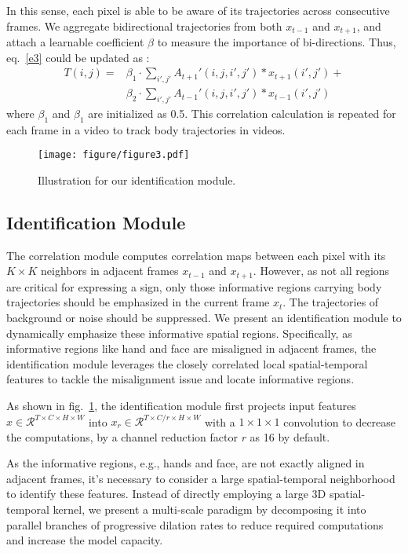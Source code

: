 \documentclass[10pt,twocolumn,letterpaper]{article}
\begin{document}
In this sense, each pixel is able to be aware of its trajectories across consecutive frames. We aggregate bidirectional trajectories from both $x_{t-1}$ and $x_{t+1}$, and attach a learnable coefficient $\beta$ to measure the importance of bi-directions. Thus, eq.~\ref{e3} could be updated as :
\begin{equation}
  \begin{aligned}
  \label{e4}
   T(i,j) = & \beta_{1}\cdot \sum_{i',j'}{A_{t+1}'(i,j,i',j') * x_{t+1}(i',j')} + \\ & \beta_{2}\cdot \sum_{i',j'}{A_{t-1}'(i,j,i',j') * x_{t-1}(i',j')}
  \end{aligned}
\end{equation}
where $\beta_{1}$ and $\beta_{1}$ are initialized as 0.5.  This correlation calculation is repeated for each frame in a video to track body trajectories in videos.

\begin{figure}[t]
  \centering
  \texttt{[image: figure/figure3.pdf]}
  \caption{Illustration for our identification module.}
  \label{fig3}
  \end{figure}

\subsection{Identification Module}
The correlation module computes correlation maps between each pixel with its $K\times K$ neighbors in adjacent frames $x_{t-1}$ and $x_{t+1}$. However, as not all regions are critical for expressing a sign, only those informative regions carrying body trajectories should be emphasized in the current frame $x_t$. The trajectories of background or noise should be suppressed. We present an identification module to dynamically emphasize these informative spatial regions. Specifically, as informative regions like hand and face are misaligned in adjacent frames, the identification module leverages the closely correlated local spatial-temporal features to tackle the misalignment issue and locate informative regions. 

As shown in fig.~\ref{fig3}, the identification module first projects input features $x\in \mathcal{R}^{T \times C\times H \times W}$ into $x_r\in \mathcal{R}^{T \times C/r\times H \times W}$ with a $1\times 1\times 1$ convolution to decrease the computations, by a channel reduction factor $r$ as 16 by default.

As the informative regions, e.g., hands and face, are not exactly aligned in adjacent frames, it's necessary to consider a large spatial-temporal neighborhood to identify these features. Instead of directly employing a large 3D spatial-temporal kernel, we present a multi-scale paradigm by decomposing it into parallel branches of progressive dilation rates to reduce required computations and increase the model capacity. 
\end{document}
